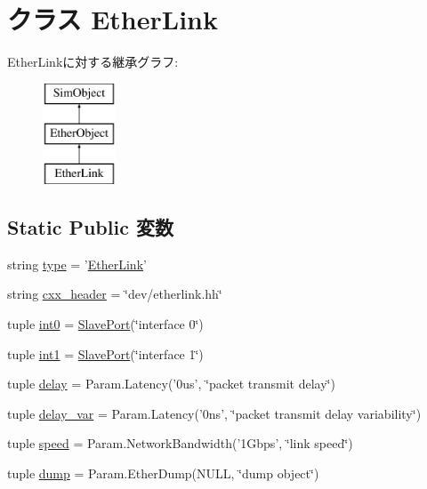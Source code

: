 \hypertarget{classEthernet_1_1EtherLink}{
\section{クラス EtherLink}
\label{classEthernet_1_1EtherLink}
}
EtherLinkに対する継承グラフ:\begin{figure}[H]
\begin{center}
\leavevmode
\includegraphics[height=3cm]{classEthernet_1_1EtherLink}
\end{center}
\end{figure}
\subsection*{Static Public 変数}
\begin{DoxyCompactItemize}
\item 
string \hyperlink{classEthernet_1_1EtherLink_acce15679d830831b0bbe8ebc2a60b2ca}{type} = '\hyperlink{classEthernet_1_1EtherLink}{EtherLink}'
\item 
string \hyperlink{classEthernet_1_1EtherLink_a17da7064bc5c518791f0c891eff05fda}{cxx\_\-header} = \char`\"{}dev/etherlink.hh\char`\"{}
\item 
tuple \hyperlink{classEthernet_1_1EtherLink_a104730226138d5db620428dfce066f24}{int0} = \hyperlink{classm5_1_1params_1_1SlavePort}{SlavePort}(\char`\"{}interface 0\char`\"{})
\item 
tuple \hyperlink{classEthernet_1_1EtherLink_ad5ae494ae031467268ae9a0b4260bf12}{int1} = \hyperlink{classm5_1_1params_1_1SlavePort}{SlavePort}(\char`\"{}interface 1\char`\"{})
\item 
tuple \hyperlink{classEthernet_1_1EtherLink_ac1ab55b34347f0110eb273c9d47d52e2}{delay} = Param.Latency('0us', \char`\"{}packet transmit delay\char`\"{})
\item 
tuple \hyperlink{classEthernet_1_1EtherLink_a17e47f6cf0d24590c65fc34c0e1aa5e9}{delay\_\-var} = Param.Latency('0ns', \char`\"{}packet transmit delay variability\char`\"{})
\item 
tuple \hyperlink{classEthernet_1_1EtherLink_a33da1950995c2bf1208262efeb4de233}{speed} = Param.NetworkBandwidth('1Gbps', \char`\"{}link speed\char`\"{})
\item 
tuple \hyperlink{classEthernet_1_1EtherLink_aef8d0e67d5fcd75abc7d08ee1952b0de}{dump} = Param.EtherDump(NULL, \char`\"{}dump object\char`\"{})
\end{DoxyCompactItemize}


